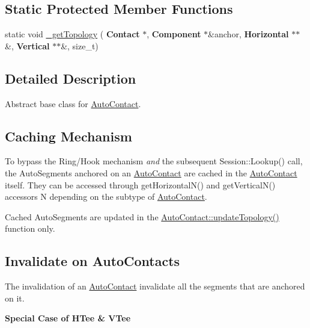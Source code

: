 \subsection*{Static Protected Member Functions}
\begin{DoxyCompactItemize}
\item 
static void \hyperlink{classKatabatic_1_1AutoContact_a2294ddd6bd4bda59c3453cc4dbd4f4fa}{\+\_\+get\+Topology} (\textbf{ Contact} $\ast$, \textbf{ Component} $\ast$\&anchor, \textbf{ Horizontal} $\ast$$\ast$\&, \textbf{ Vertical} $\ast$$\ast$\&, size\+\_\+t)
\end{DoxyCompactItemize}


\subsection{Detailed Description}
Abstract base class for \hyperlink{classKatabatic_1_1AutoContact}{Auto\+Contact}. 

\hypertarget{classKatabatic_1_1AutoContact_secACCache}{}\subsection{Caching Mechanism}\label{classKatabatic_1_1AutoContact_secACCache}
To bypass the Ring/\+Hook mechanism {\itshape and} the subsequent Session\+::\+Lookup() call, the Auto\+Segments anchored on an \hyperlink{classKatabatic_1_1AutoContact}{Auto\+Contact} are cached in the \hyperlink{classKatabatic_1_1AutoContact}{Auto\+Contact} itself. They can be accessed through {\ttfamily get\+Horizontal\+N()} and get\+Vertical\+N() accessors {\ttfamily N} depending on the subtype of \hyperlink{classKatabatic_1_1AutoContact}{Auto\+Contact}.

Cached Auto\+Segments are updated in the \hyperlink{classKatabatic_1_1AutoContact_a690764ddc997fe9766a79c4b8e0c3e2f}{Auto\+Contact\+::update\+Topology()} function only.\hypertarget{classKatabatic_1_1AutoContact_secACInvalidate}{}\subsection{Invalidate on Auto\+Contacts}\label{classKatabatic_1_1AutoContact_secACInvalidate}
The invalidation of an \hyperlink{classKatabatic_1_1AutoContact}{Auto\+Contact} invalidate all the segments that are anchored on it.

{\bfseries Special Case of H\+Tee \& V\+Tee}

